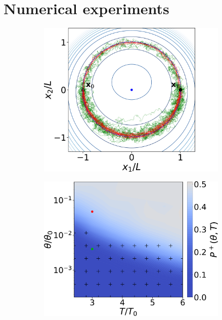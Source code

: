 \section{Numerical experiments}

\begin{figure} 
    \centering
     
    \begin{subfigure}[b]{0.31\textwidth}  
        \centering 
        \includegraphics[width=\textwidth]{figs_part1/mcmc/switch_trajectories_without_force}
        \caption[]%
        {}    
    \end{subfigure}
    \hfill
    \begin{subfigure}[b]{0.33\textwidth}
        \centering
        \includegraphics[width=\textwidth]{figs_part1/mcmc/switch_channel_rates}

\end{subfigure}
\end{figure}
